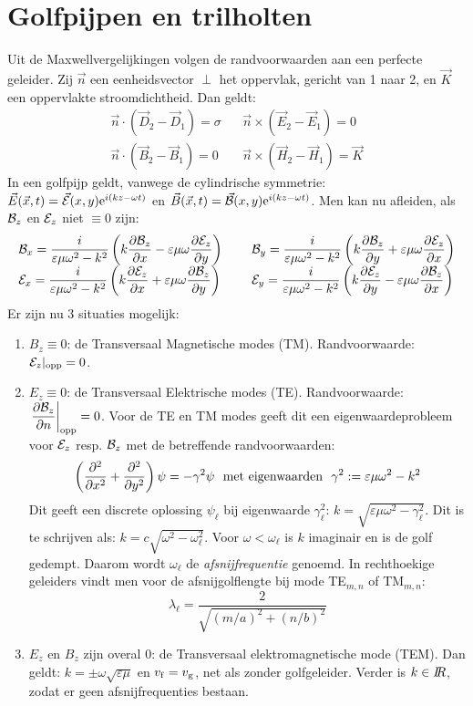 \documentclass[twoside]{report}
\begin{document}
\section{Golfpijpen en trilholten}
Uit de Maxwellvergelijkingen volgen de randvoorwaarden aan een perfecte
geleider. Zij $\vec{n}$ een eenheidsvector $\perp$ het oppervlak, gericht
van 1 naar 2, en $\vec{K}$ een oppervlakte stroomdichtheid. Dan geldt:
\[
\begin{array}{ll}
\vec{n}\cdot(\vec{D}_2-\vec{D}_1)=\sigma~~&~~\vec{n}\times(\vec{E}_2-\vec{E}_1)=0\\
\vec{n}\cdot(\vec{B}_2-\vec{B}_1)=0~~&~~\vec{n}\times(\vec{H}_2-\vec{H}_1)=\vec{K}
\end{array}
\]
In een golfpijp geldt, vanwege de cylindrische symmetrie:
$\vec{E}(\vec{x},t)=\vec{{\cal E}}(x,y){\rm e}^{i(kz-\omega t)}$ en
$\vec{B}(\vec{x},t)=\vec{{\cal B}}(x,y){\rm e}^{i(kz-\omega t)}$. Men kan
nu afleiden, als ${\cal B}_z$ en ${\cal E}_z$ niet $\equiv0$ zijn:
\[
\begin{array}{ll}
\displaystyle
{\cal B}_x=\frac{i}{\varepsilon\mu\omega^2-k^2}\left(k\frac{\partial {\cal B}_z}{\partial x}-\varepsilon\mu\omega\frac{\partial {\cal E}_z}{\partial y}\right)~~&~~
\displaystyle
{\cal B}_y=\frac{i}{\varepsilon\mu\omega^2-k^2}\left(k\frac{\partial {\cal B}_z}{\partial y}+\varepsilon\mu\omega\frac{\partial {\cal E}_z}{\partial x}\right)\\
\displaystyle
{\cal E}_x=\frac{i}{\varepsilon\mu\omega^2-k^2}\left(k\frac{\partial {\cal E}_z}{\partial x}+\varepsilon\mu\omega\frac{\partial {\cal B}_z}{\partial y}\right)~~&~~
\displaystyle
{\cal E}_y=\frac{i}{\varepsilon\mu\omega^2-k^2}\left(k\frac{\partial {\cal E}_z}{\partial y}-\varepsilon\mu\omega\frac{\partial {\cal B}_z}{\partial x}\right)
\end{array}
\]
Er zijn nu 3 situaties mogelijk:
\begin{enumerate}
\item $B_z\equiv0$: de Transversaal Magnetische modes (TM). Randvoorwaarde:
      ${\cal E}_z|_{\rm opp}=0$.
\item $E_z\equiv0$: de Transversaal Elektrische modes (TE). Randvoorwaarde:
      $\displaystyle\left.\frac{\partial {\cal B}_z}{\partial n}\right|_{\rm opp}=0$.
      \npar
      Voor de TE en TM modes geeft dit een eigenwaardeprobleem voor ${\cal E}_z$
      resp. ${\cal B}_z$ met de betreffende randvoorwaarden:
      \[
      \left(\frac{\partial^2 }{\partial x^2}+\frac{\partial^2 }{\partial y^2}\right)\psi=-\gamma^2\psi~~\mbox{met eigenwaarden}~~
      \gamma^2:=\varepsilon\mu\omega^2-k^2
      \]
      Dit geeft een discrete oplossing $\psi_\ell$ bij eigenwaarde
      $\gamma_\ell^2$: $k=\sqrt{\varepsilon\mu\omega^2-\gamma_\ell^2}$.
      Dit is te schrijven als: $k=c\sqrt{\omega^2-\omega_\ell^2}$. Voor
      $\omega<\omega_\ell$ is $k$ imaginair en is de golf gedempt. Daarom
      wordt $\omega_\ell$ de {\it afsnijfrequentie} genoemd. In rechthoekige
      geleiders vindt men voor de afsnijgolflengte bij mode TE$_{m,n}$ of
      TM$_{m,n}$:
      \[
      \lambda_\ell=\frac{2}{\sqrt{(m/a)^2+(n/b)^2}}
      \]
\item $E_z$ en $B_z$ zijn overal 0: de Transversaal elektromagnetische mode
      (TEM). Dan geldt: $k=\pm\omega\sqrt{\varepsilon\mu}$ en
      $v_{\rm f}=v_{\rm g}$, net als zonder golfgeleider. Verder is $k\in I\hspace{-1mm}R$,
      zodat er geen afsnijfrequenties bestaan.
\end{enumerate}
\end{document}
